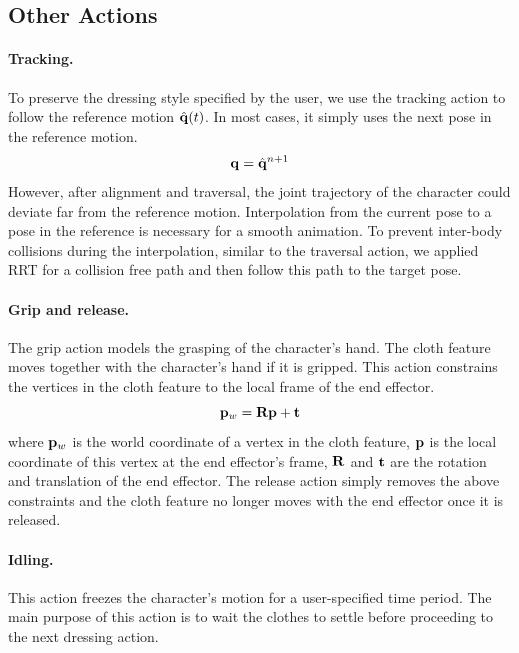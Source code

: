 \subsection{Other Actions}

\paragraph{Tracking.} To preserve the dressing style specified by the user, we use the tracking action to follow the reference motion $\hat{\mathbf{q}}(t)$. In most cases, it simply uses the next pose in the reference motion.
\begin{displaymath}
\mathbf{q} = \hat{\mathbf{q}}^{n+1}
\end{displaymath}
However, after alignment and traversal, the joint trajectory of the character could deviate far from the reference motion. Interpolation from the current pose to a pose in the reference is necessary for a smooth animation. To prevent inter-body collisions during the interpolation, similar to the traversal action, we applied RRT for a collision free path and then follow this path to the target pose.


\paragraph{Grip and release.}
The grip action models the grasping of the character's hand. The cloth feature moves together with the character's hand if it is gripped. This action constrains the vertices in the cloth feature to the local frame of the end effector.
\begin{displaymath}
\mathbf{p}_w = \mathbf{Rp} + \mathbf{t}
\end{displaymath}
where $\mathbf{p}_w$ is the world coordinate of a vertex in the cloth feature, $\mathbf{p}$ is the local coordinate of this vertex at the end effector's frame, $\mathbf{R}$ and $\mathbf{t}$ are the rotation and translation of the end effector. The release action simply removes the above constraints and the cloth feature no longer moves with the end effector once it is released.

\paragraph{Idling.} This action freezes the character's motion for a user-specified time period. The main purpose of this action is to wait the clothes to settle before proceeding to the next dressing action.

